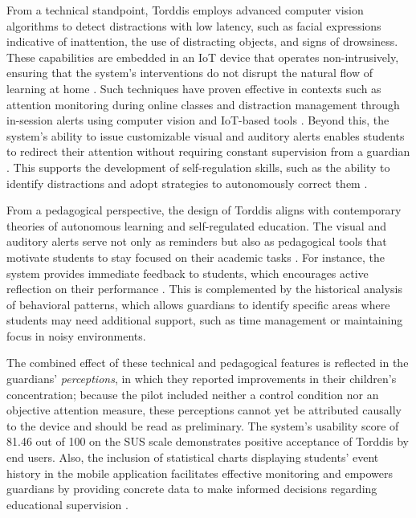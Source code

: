From a technical standpoint, Torddis employs advanced computer vision algorithms to detect distractions with low latency, such as facial expressions indicative of inattention, the use of distracting objects, and signs of drowsiness. These capabilities are embedded in an IoT device that operates non-intrusively, ensuring that the system's interventions do not disrupt the natural flow of learning at home \citep{Roy2022, Chen2022, Ucar2022Recognizing, Asish2022Detecting}. Such techniques have proven effective in contexts such as attention monitoring during online classes and distraction management through in-session alerts using computer vision and IoT-based tools \citep{Chen2022, Ucar2022Recognizing}. Beyond this, the system's ability to issue customizable visual and auditory alerts enables students to redirect their attention without requiring constant supervision from a guardian \citep{Ackermans2025Young}. This supports the development of self-regulation skills, such as the ability to identify distractions and adopt strategies to autonomously correct them \citep{Wang2025Development}.

From a pedagogical perspective, the design of Torddis aligns with contemporary theories of autonomous learning and self-regulated education. The visual and auditory alerts serve not only as reminders but also as pedagogical tools that motivate students to stay focused on their academic tasks \citep{Mohamed2018Implementing}. For instance, the system provides immediate feedback to students, which encourages active reflection on their performance \citep{Ackermans2025Young}. This is complemented by the historical analysis of behavioral patterns, which allows guardians to identify specific areas where students may need additional support, such as time management or maintaining focus in noisy environments.

The combined effect of these technical and pedagogical features is reflected in the guardians' \emph{perceptions}, in which they reported improvements in their children's concentration; because the pilot included neither a control condition nor an objective attention measure, these perceptions cannot yet be attributed causally to the device and should be read as preliminary. The system's usability score of 81.46 out of 100 on the SUS scale demonstrates positive acceptance of Torddis by end users. Also, the inclusion of statistical charts displaying students’ event history in the mobile application facilitates effective monitoring and empowers guardians by providing concrete data to make informed decisions regarding educational supervision \citep{Wang2025Development}.

